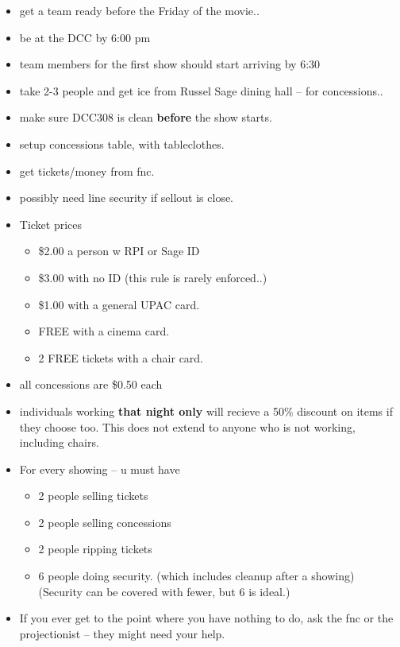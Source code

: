 \begin{itemize}

\item get a team ready before the Friday of the movie..

\item be at the DCC by 6:00 pm

\item team members for the first show should start arriving by 6:30

\item take 2-3 people and get ice from Russel Sage dining hall -- for 
      concessions..

\item make sure DCC308 is clean {\bf before} the show starts.

\item setup concessions table, with tableclothes. 

\item get tickets/money from fnc.

\item possibly need line security if sellout is close.

\item Ticket prices 
\begin{itemize}
\item  \$2.00 a person w\/ RPI or Sage ID
\item  \$3.00 with no ID (this rule is rarely enforced..)
\item  \$1.00 with a general UPAC card.
\item  FREE with a cinema card.
\item  2 FREE tickets with a chair card.
\end{itemize}

\item all concessions are \$0.50 each
\item individuals working {\bf that night only} will recieve a 50{\%} discount
  on items
  if they choose too. This does not extend to anyone who is not working,
  including chairs.

\item For every showing -- u must have 
\begin{itemize}
\item     2 people selling tickets
\item     2 people selling concessions
\item     2 people ripping tickets
\item     6 people doing security. (which includes cleanup after a showing)\\
       (Security can be covered with fewer, but 6 is ideal.)
\end{itemize}

\item If you ever get to the point where you have nothing to do, ask the
  fnc or the projectionist -- they might need your help.

\end{itemize}


